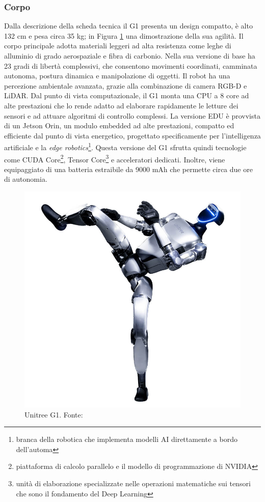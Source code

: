 \subsubsection{Corpo}
Dalla descrizione della scheda tecnica \cite{unitreeManual2025} il G1 presenta un design compatto, è alto 132 cm e pesa circa 35 kg; in Figura \ref{fig:G1} una dimostrazione della sua agilità. Il corpo principale adotta materiali leggeri ad alta resistenza come leghe di alluminio di grado aerospaziale e fibra di carbonio. Nella sua versione di base ha 23 gradi di libertà complessivi, che consentono movimenti coordinati, camminata autonoma, postura dinamica e manipolazione di oggetti. Il robot ha una percezione ambientale avanzata, grazie alla combinazione di camera RGB-D e LiDAR. Dal punto di vista computazionale, il G1 monta una CPU a 8 core ad alte prestazioni che lo rende adatto ad elaborare rapidamente le letture dei sensori e ad attuare algoritmi di controllo complessi. La versione EDU è provvista di un Jetson Orin, un modulo embedded ad alte prestazioni, compatto ed efficiente dal punto di vista energetico, progettato specificamente per l'intelligenza artificiale e la \textit{edge robotics}\footnote{branca della robotica che implementa modelli AI direttamente a bordo dell'automa}. Questa versione del G1 sfrutta quindi tecnologie come CUDA Core\footnote{piattaforma di calcolo parallelo e il modello di programmazione di NVIDIA}, Tensor Core\footnote{unità di elaborazione specializzate nelle operazioni matematiche sui tensori che sono il fondamento del Deep Learning} e acceleratori dedicati. Inoltre, viene equipaggiato di una batteria estraibile da 9000 mAh che permette circa due ore di autonomia.

\begin{figure}[h]
    \centering
    \includegraphics[width=0.25\linewidth]{immagini/Unitree_G1.jpg}
    \caption{Unitree G1. Fonte: \cite{unitreeManual2025}}
    \label{fig:G1}
\end{figure}


